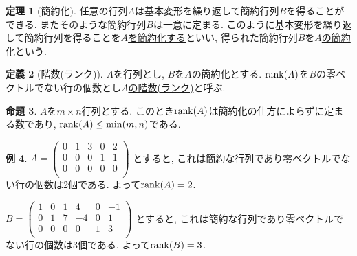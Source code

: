 \documentclass[dvipdfmx,a4paper,11pt]{article}
\theoremstyle{definition}
\newtheorem{thm}{定理}
\newtheorem{prop}[thm]{命題}
\newtheorem{dfn}[thm]{定義}
\newtheorem{exa}[thm]{例}
\begin{document}
 \begin{tcolorbox}[
    colback = white,
    colframe = green!35!black,
    fonttitle = \bfseries,
    breakable = true]
    \begin{thm}[簡約化]
    任意の行列$A$は基本変形を繰り返して簡約行列$B$を得ることができる. またそのような簡約行列$B$は一意に定まる.
 このように基本変形を繰り返して簡約行列を得ることを\underline{$A$を簡約化する}といい, 得られた簡約行列$B$を\underline{$A$の簡約化}という.
   \end{thm}
 \end{tcolorbox}
 
 
 \begin{tcolorbox}[
    colback = white,
    colframe = green!35!black,
    fonttitle = \bfseries,
    breakable = true]
    \begin{dfn}[階数(ランク)]
$A$を行列とし, $B$を$A$の簡約化とする.
${\rm rank}(A)$を$B$の零ベクトルでない行の個数とし\underline{$A$の階数(ランク)}と呼ぶ.
   \end{dfn}
 \end{tcolorbox}
 
 
  \begin{tcolorbox}[
    colback = white,
    colframe = green!35!black,
    fonttitle = \bfseries,
    breakable = true]
    \begin{prop}
   $A$を$m\times n$行列とする. 
   このとき${\rm rank}(A)$は簡約化の仕方によらずに定まる数であり, ${\rm rank}(A) \le \min(m,n)$である.
   \end{prop}
 \end{tcolorbox}
 
 
\begin{exa}
$A=
 \begin{pmatrix}
 0& 1& 3  & 0&2\\
 0& 0& 0  & 1&1\\
 0& 0& 0 & 0&0\\
 \end{pmatrix}
 $
 とすると, これは簡約な行列であり零ベクトルでない行の個数は2個である. よって${\rm rank}(A)=2$.
 
 $B= \begin{pmatrix}
 1& 0& 1  & 4&0&-1\\
 0& 1& 7 & -4&0&1\\
 0& 0& 0 & 0&1&3\\
 \end{pmatrix}
 $ とすると, これは簡約な行列であり零ベクトルでない行の個数は3個である. よって${\rm rank}(B)=3$.
\end{exa}
\end{document}
